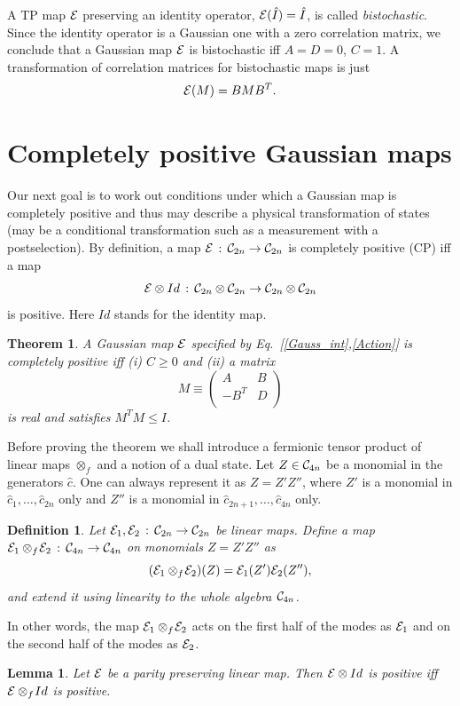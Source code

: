 \documentclass[twocolumn,showpacs,preprintnumbers,superscriptaddress]{revtex4}
\newtheorem{theorem}{Theorem}
\newtheorem{lemma}{Lemma}
\newtheorem{dfn}{Definition}
\newcommand{\calE}{{\cal E }}
\newcommand{\Clif}{{\cal C}}
\newcommand{\ba}{\begin{array}}
\newcommand{\ea}{\end{array}}
\newcommand{\cop}{{\hat{c}}}
\newcommand{\Iop}{{\hat{I}}}
\begin{document}
A TP map $\calE$ preserving an identity operator, $\calE(\Iop)=\Iop$,
is called {\it bistochastic}. Since the identity operator is a Gaussian one
with a zero correlation matrix, we conclude that a Gaussian map $\calE$
is bistochastic iff $A=D=0$, $C=1$. 
A transformation of correlation matrices for bistochastic maps is just
\[
\calE(M)=BMB^T.
\]



\section{Completely positive Gaussian maps}
\label{sec:CP}

Our next goal is to work out conditions under which a Gaussian map
is completely positive  and thus may describe a physical 
transformation of states (may be a conditional transformation such as a 
measurement with a postselection).
By definition, a map $\calE\, : \, \Clif_{2n}\to \Clif_{2n}$ is completely
positive (CP) iff
a map 
\[
\calE\otimes Id \, : \, \Clif_{2n}\otimes \Clif_{2n}\to \Clif_{2n}\otimes
\Clif_{2n}
\]
is positive. Here $Id$ stands for the identity map.
\begin{theorem}\label{theorem:GCP-maps}
A Gaussian map $\calE$ specified  by Eq.~[\ref{Gauss_int},\ref{Action}] is
completely positive iff (i) $C\ge 0$ and (ii) a matrix
\[
M\equiv \left( \ba{cc} A & B \\ -B^T & D \\ \ea \right) 
\]
is real and satisfies  $M^T M \le I$.
\end{theorem}
Before proving the theorem
we shall introduce a fermionic tensor product of linear maps $\otimes_f$
and  a notion of a dual state.
Let $Z\in \Clif_{4n}$ be a monomial in the generators $\cop$. One can always
represent it as $Z=Z'Z''$, where $Z'$ is a monomial in $\cop_1,\ldots,\cop_{2n}$ only and
$Z''$ is a monomial in $\cop_{2n+1},\ldots,\cop_{4n}$ only.
\begin{dfn}\label{def:Z'Z''}
Let  $\calE_1, \calE_2\, : \, \Clif_{2n}\to \Clif_{2n}$ be linear maps.
Define a map $\calE_1\otimes_f\! \calE_2\, : \, \Clif_{4n}\to \Clif_{4n}$ 
on monomials $Z=Z'Z''$ as
\[
(\calE_1\otimes_f\! \calE_2)(Z)=\calE_1(Z') \calE_2(Z''),
\]
and extend it using linearity to the whole algebra $\Clif_{4n}$.
\end{dfn}
In other words, the map $\calE_1\otimes_f\! \calE_2$ acts on the
first half of the modes as $\calE_1$ and on the second
half of the modes as $\calE_2$.
\begin{lemma}\label{lemma:pos}
Let $\calE$ be a parity preserving linear map. Then
$\calE\otimes Id$ is positive iff $\calE\otimes_f\! Id$
is positive.
\end{lemma}
\end{document}
